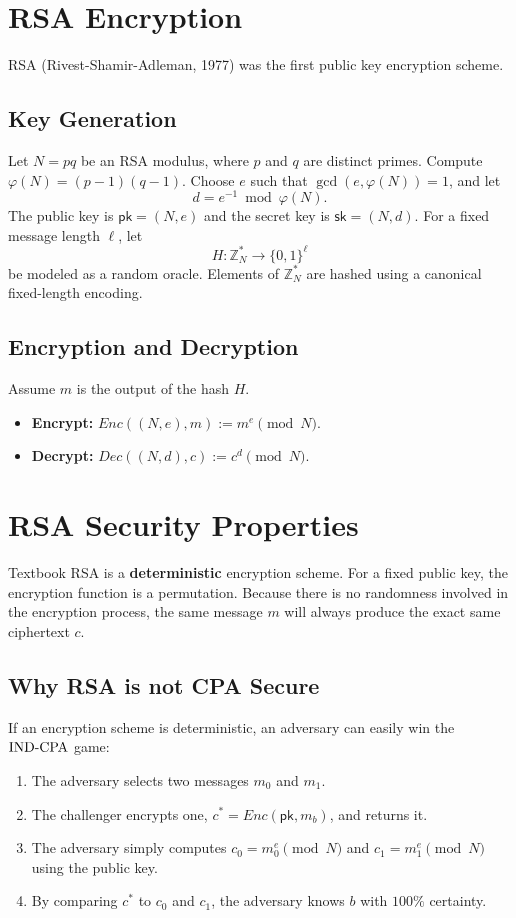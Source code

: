 \section{RSA Encryption}
RSA (Rivest-Shamir-Adleman, 1977) was the first public key encryption scheme.

\subsection{Key Generation}

Let $N=pq$ be an RSA modulus, where $p$ and $q$ are distinct primes.
Compute $\varphi(N) = (p-1)(q-1)$.
Choose $e$ such that $\gcd(e,\varphi(N))=1$, and let
\[
    d = e^{-1} \bmod \varphi(N).
\]
The public key is $\mathsf{pk}=(N,e)$ and the secret key is
$\mathsf{sk}=(N,d)$.
For a fixed message length $\ell$, let
\[
    H:\mathbb{Z}_N^{*}\longrightarrow\{0,1\}^{\ell}
\]
be modeled as a random oracle. Elements of $\mathbb{Z}_N^{*}$
are hashed using a canonical fixed-length encoding.

\subsection{Encryption and Decryption}

Assume $m$ is the output of the hash $H$.
\begin{itemize}
    \item \textbf{Encrypt:} $Enc((N, e), m) := m^e \pmod N$.
    \item \textbf{Decrypt:} $Dec((N, d), c) := c^d \pmod N$.
\end{itemize}

\section{RSA Security Properties}

Textbook RSA is a \textbf{deterministic} encryption scheme. For a fixed public key, the encryption function is a permutation.
Because there is no randomness involved in the encryption process, the same message $m$ will always produce the exact same ciphertext $c$.

\subsection{Why RSA is not CPA Secure}

If an encryption scheme is deterministic, an adversary can easily win the $\text{IND-CPA}$ game:
\begin{enumerate}
    \item The adversary selects two messages $m_0$ and $m_1$.
    \item The challenger encrypts one, $c^* = Enc(\mathsf{pk}, m_b)$, and returns it.    \item The adversary simply computes $c_0 = m_0^e \pmod N$ and $c_1 = m_1^e \pmod N$ using the public key.
    \item By comparing $c^*$ to $c_0$ and $c_1$, the adversary knows $b$ with $100\%$ certainty.
\end{enumerate}

